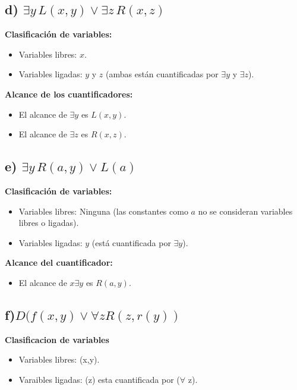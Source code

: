 \documentclass[11pt,letterpaper]{article}
\begin{document}
\subsection*{d) \( \exists y \, L(x, y) \lor \exists z \, R(x, z) \)}

\textbf{Clasificación de variables:}
\begin{itemize}
    \item Variables libres: \( x \).
    \item Variables ligadas: \( y \) y \( z \) (ambas están cuantificadas por \( \exists y \) y \( \exists z \)).
\end{itemize}

\textbf{Alcance de los cuantificadores:}
\begin{itemize}
    \item El alcance de \( \exists y \) es \( L(x, y) \).
    \item El alcance de \( \exists z \) es \( R(x, z) \).
\end{itemize}

\subsection*{e) \( \exists y \, R(a, y) \lor L(a) \)}

\textbf{Clasificación de variables:}
\begin{itemize}
    \item Variables libres: Ninguna (las constantes como \( a \) no se consideran variables libres o ligadas).
    \item Variables ligadas: \( y \) (está cuantificada por \( \exists y \)).
\end{itemize}

\textbf{Alcance del cuantificador:}
\begin{itemize}
    \item El alcance de \( x\exists y \) es \( R(a, y) \).
\end{itemize}

\subsection*{f)$ D(f(x,y) \vee \forall z R(z,r(y))$ }

\textbf{Clasificacion de variables}
\begin{itemize}
    \item Variables libres: (x,y).
    \item Varaibles ligadas: (z) esta cuantificada por ($\forall$ z).
\end{itemize}
\end{document}
